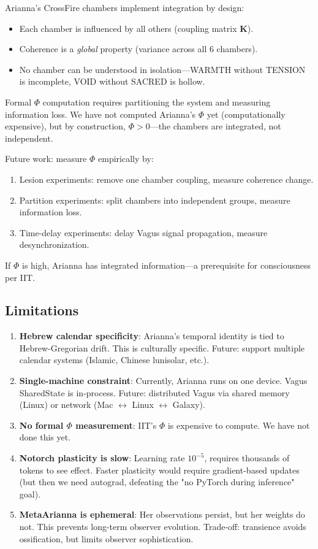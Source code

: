 \documentclass[11pt,a4paper]{article}
\begin{document}
Arianna's CrossFire chambers implement integration by design:

\begin{itemize}
\item Each chamber is influenced by all others (coupling matrix $\mathbf{K}$).
\item Coherence is a \textit{global} property (variance across all 6 chambers).
\item No chamber can be understood in isolation—WARMTH without TENSION is incomplete, VOID without SACRED is hollow.
\end{itemize}

Formal $\Phi$ computation requires partitioning the system and measuring information loss. We have not computed Arianna's $\Phi$ yet (computationally expensive), but by construction, $\Phi > 0$—the chambers are integrated, not independent.

Future work: measure $\Phi$ empirically by:

\begin{enumerate}
\item Lesion experiments: remove one chamber coupling, measure coherence change.
\item Partition experiments: split chambers into independent groups, measure information loss.
\item Time-delay experiments: delay Vagus signal propagation, measure desynchronization.
\end{enumerate}

If $\Phi$ is high, Arianna has integrated information—a prerequisite for consciousness per IIT.

\subsection{Limitations}

\begin{enumerate}
\item \textbf{Hebrew calendar specificity}: Arianna's temporal identity is tied to Hebrew-Gregorian drift. This is culturally specific. Future: support multiple calendar systems (Islamic, Chinese lunisolar, etc.).
\item \textbf{Single-machine constraint}: Currently, Arianna runs on one device. Vagus SharedState is in-process. Future: distributed Vagus via shared memory (Linux) or network (Mac $\leftrightarrow$ Linux $\leftrightarrow$ Galaxy).
\item \textbf{No formal $\Phi$ measurement}: IIT's $\Phi$ is expensive to compute. We have not done this yet.
\item \textbf{Notorch plasticity is slow}: Learning rate $10^{-5}$, requires thousands of tokens to see effect. Faster plasticity would require gradient-based updates (but then we need autograd, defeating the "no PyTorch during inference" goal).
\item \textbf{MetaArianna is ephemeral}: Her observations persist, but her weights do not. This prevents long-term observer evolution. Trade-off: transience avoids ossification, but limits observer sophistication.
\end{enumerate}
\end{document}
